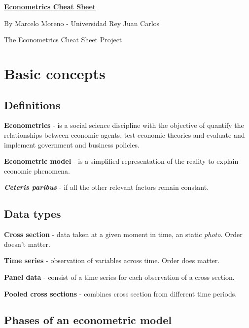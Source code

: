 \documentclass[10pt, a4paper, landscape]{extarticle}
\begin{document}
\setlength{\footskip}{12pt}

\begin{multicols}{3}

\begin{center}
	\textbf{\LARGE \href{https://github.com/marcelomijas/econometrics-cheatsheet}{Econometrics Cheat Sheet}}
	
	{\footnotesize By Marcelo Moreno - Universidad Rey Juan Carlos}
	
	{\footnotesize The Econometrics Cheat Sheet Project}
\end{center}

\section*{Basic concepts}

\subsection*{Definitions}

\textbf{Econometrics} - is a social science discipline with the objective of quantify the relationships between economic agents, test economic theories and evaluate and implement government and business policies.

\textbf{Econometric model} - is a simplified representation of the reality to explain economic phenomena.

\textbf{\textsl{Ceteris paribus}} - if all the other relevant factors remain constant.

\subsection*{Data types}

\textbf{Cross section} - data taken at a given moment in time, an static \textsl{photo}. Order doesn't matter.

\textbf{Time series} - observation of variables across time. Order does matter.

\textbf{Panel data} - consist of a time series for each observation of a cross section.

\textbf{Pooled cross sections} - combines cross section from different time periods.

\subsection*{Phases of an econometric model}


\end{multicols}
\end{document}
